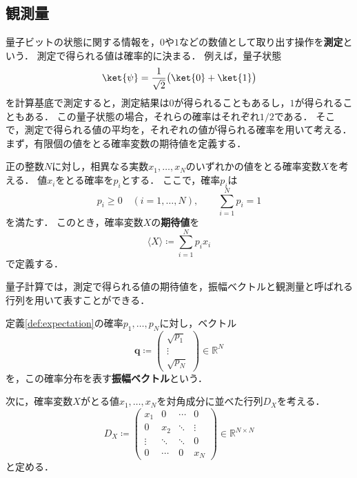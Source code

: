 \subsection{観測量}
\label{subsec:observables}

量子ビットの状態に関する情報を，$0$や$1$などの数値として取り出す操作を\textbf{測定}という．
測定で得られる値は確率的に決まる．
例えば，量子状態
\begin{equation*}
  \ket{\psi}=\frac{1}{\sqrt{2}}\bigl(\ket{0}+\ket{1}\bigr)
\end{equation*}
を計算基底で測定すると，測定結果は$0$が得られることもあるし，$1$が得られることもある．
この量子状態の場合，それらの確率はそれぞれ$1/2$である．
そこで，測定で得られる値の平均を，それぞれの値が得られる確率を用いて考える．
まず，有限個の値をとる確率変数の期待値を定義する．

\begin{defi}[期待値]
\label{def:expectation}
正の整数$N$に対し，相異なる実数$x_1,\ldots,x_N$のいずれかの値をとる確率変数$X$を考える．
値$x_i$をとる確率を$p_i$とする．
ここで，確率$p_i$は
\begin{equation*}
  p_i\geq 0\quad(i=1,\ldots,N),
  \qquad
  \sum_{i=1}^{N}p_i=1
\end{equation*}
を満たす．
このとき，確率変数$X$の\textbf{期待値}を
\begin{equation}
  \langle X\rangle\coloneq\sum_{i=1}^{N}p_i x_i
  \label{eq:expectation-finite-distribution}
\end{equation}
で定義する．
\end{defi}

量子計算では，測定で得られる値の期待値を，振幅ベクトルと観測量と呼ばれる行列を用いて表すことができる．

\begin{defi}[振幅ベクトル]
\label{def:classical-amplitude-vector}
定義\ref{def:expectation}の確率$p_1,\ldots,p_N$に対し，ベクトル
\begin{equation}
  \bm{q}\coloneq
  \begin{pmatrix}
    \sqrt{p_1}\\
    \vdots\\
    \sqrt{p_N}
  \end{pmatrix}
  \in\mathbb R^N
  \label{eq:classical-amplitude-vector}
\end{equation}
を，この確率分布を表す\textbf{振幅ベクトル}という．
\end{defi}

次に，確率変数$X$がとる値$x_1,\ldots,x_N$を対角成分に並べた行列$D_X$を考える．
\begin{equation}
  D_X\coloneq 
  \begin{pmatrix}
    x_1 & 0 & \cdots & 0\\
    0 & x_2 & \ddots & \vdots\\
    \vdots & \ddots & \ddots & 0\\
    0 & \cdots & 0 & x_N
  \end{pmatrix}
  \in\mathbb R^{N\times N}
  \label{eq:classical-observable-diagonal-matrix}
\end{equation}
と定める．

